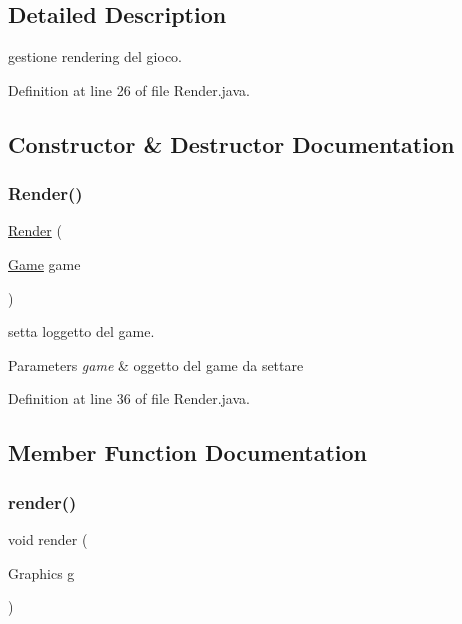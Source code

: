 \subsection{Detailed Description}
gestione rendering del gioco. 

Definition at line 26 of file Render.\+java.



\subsection{Constructor \& Destructor Documentation}
\mbox{\label{classprogetto_1_1_render_a48af9c547fb0510ade78ea4456cb1bb4}} 
\subsubsection{\texorpdfstring{Render()}{Render()}}
{\footnotesize\ttfamily \hyperlink{classprogetto_1_1_render}{Render} (\begin{DoxyParamCaption}\item[{\hyperlink{classprogetto_1_1_game}{Game}}]{game }\end{DoxyParamCaption})}



setta l\textquotesingle{}oggetto del game. 


\begin{DoxyParams}{Parameters}
{\em game} & oggetto del game da settare \\
\hline
\end{DoxyParams}


Definition at line 36 of file Render.\+java.



\subsection{Member Function Documentation}
\mbox{\label{classprogetto_1_1_render_a203b6ad9d5e4d54dd1152986eec4dedc}} 
\subsubsection{\texorpdfstring{render()}{render()}}
{\footnotesize\ttfamily void render (\begin{DoxyParamCaption}\item[{Graphics}]{g }\end{DoxyParamCaption})}



